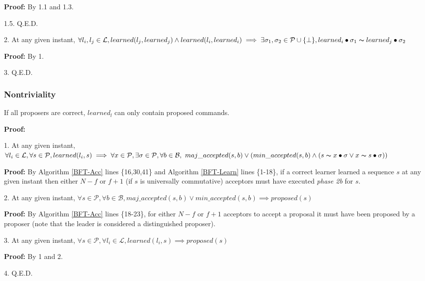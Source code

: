 \indent\indent\indent\indent\parbox{\linewidth}{\strut\textbf{Proof:} By 1.1 and 1.3.}\par
\indent\indent\indent\parbox{\linewidth}{\strut1.5. Q.E.D. }\par
\parbox{\linewidth-\algorithmicindent*3}{\strut2. At any given instant, $\forall l_i,l_j \in \mathcal{L}, learned(l_j,learned_j) \land learned(l_i,learned_i) \implies \exists \sigma_1,\sigma_2 \in \mathcal{P} \cup \{\bot\}, learned_i \bullet \sigma_1 \thicksim learned_j \bullet \sigma_2$}\par
\indent\indent\parbox{\linewidth}{\strut\textbf{Proof:} By 1.}\par
\parbox{\linewidth}{\strut3. Q.E.D.} \par

\subsubsection{Nontriviality}
\begin{theorem}
If all proposers are correct, $learned_l$ can only contain proposed commands. \label{N-T1} \par
\end{theorem} 
\textbf{Proof:} \par
\parbox{\linewidth-\algorithmicindent}{\strut1. At any given instant, $\forall l_i \in \mathcal{L}, \forall s \in \mathcal{P}, learned(l_i,s) \implies \forall x \in \mathcal{P}, \exists \sigma \in \mathcal{P}, \forall b \in \mathcal{B}, \ maj\_accepted(s,b) \lor (min\_accepted(s,b) \land  (s \thicksim x \bullet \sigma \lor x \thicksim s \bullet \sigma))$ }\par
\indent\indent\parbox{\linewidth-\algorithmicindent*2}{\strut\textbf{Proof:} By Algorithm \ref{BFT-Acc} lines \{16,30,41\} and Algorithm \ref{BFT-Learn} lines \{1-18\}, if a correct learner learned a sequence $s$ at any given instant then either $N-f$ or $f+1$ (if $s$ is universally commutative) acceptors must have executed \textit{phase 2b} for $s$.}\par
\parbox{\linewidth}{\strut2. At any given instant, $\forall s \in \mathcal{P}, \forall b \in \mathcal{B}, maj\_accepted(s,b) \lor min\_accepted(s,b) \implies proposed(s)$ }\par
\indent\indent\parbox{\linewidth-\algorithmicindent*2}{\strut\textbf{Proof:} By Algorithm \ref{BFT-Acc} lines \{18-23\}, for either $N-f$ or $f+1$ acceptors to accept a proposal it must have been proposed by a proposer (note that the leader is considered a distinguished proposer).}\par
\parbox{\linewidth}{\strut3. At any given instant, $\forall s \in \mathcal{P}, \forall l_i \in \mathcal{L}, learned(l_i,s) \implies proposed(s)$}\par
\indent\indent\parbox{\linewidth}{\strut\textbf{Proof:} By 1 and 2.}\par
\parbox{\linewidth}{\strut4. Q.E.D.}\par

